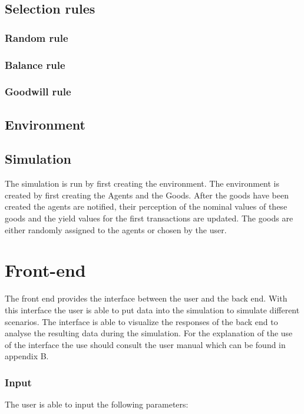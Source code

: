 \documentclass[twoside,openright]{uva-bachelor-thesis}
\begin{document}
\subsection{Selection rules}

\subsubsection{Random rule}

\subsubsection{Balance rule}

\subsubsection{Goodwill rule}

\subsection{Environment}

\subsection{Simulation}
The simulation is run by first creating the environment. The environment is created by first creating the Agents and the Goods. After the goods have been created the agents are notified, their perception of the nominal values of these goods and the yield values for the first transactions are updated. The goods are either randomly assigned to the agents or chosen by the user.


\section{Front-end}
The front end provides the interface between the user and the back end. With this interface the user is able to put data into the simulation to simulate different scenarios. The interface is able to visualize the responses of the back end to analyse the resulting data during the simulation. For the explanation of the use of the interface the use should consult the user manual which can be found in appendix B.

\subsubsection{Input}
The user is able to input the following parameters:
\end{document}
